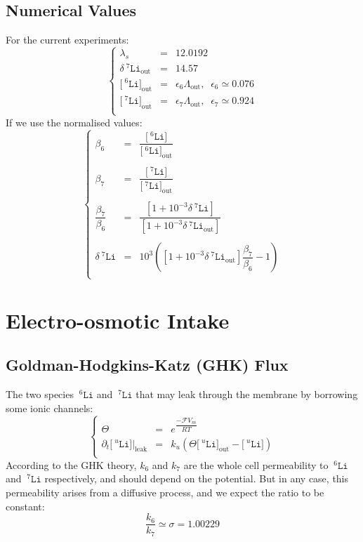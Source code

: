 \documentclass[aps,onecolumn,11pt]{revtex4}
\newcommand{\mychem}[1]{\mathtt{#1}}
\newcommand{\myconc}[1]{\big[#1\big]}
\newcommand{\Faraday}{\mathcal{F}}
\newcommand{\spLi}[1]{{\!~^{#1}\mychem{Li}}}
\newcommand{\Li}[1]{\myconc{\spLi{#1}}}
\newcommand{\deltaLi}{\delta\!\!\spLi{7}}
\newcommand{\myleak}[1]{\left.{#1}\right\vert_{\mathrm{leak}}}
\newcommand{\myout}[1]{{#1}_{\mathrm{out}}}
\newcommand{\LiOut}[1]{\myout{\Li{#1}}}
\newcommand{\LiAll}{\Lambda}
\newcommand{\LiAllOut}{\myout{\LiAll}}
\newcommand{\deltaLiOut}{\myout{\deltaLi}}
\begin{document}
\subsection{Numerical Values}
For the current experiments:
\begin{equation}
\left\lbrace
\begin{array}{rcl}
	\lambda_s   & = & 12.0192\\
	\deltaLiOut & = & 14.57\\
	\LiOut{6}   & = & \epsilon_6 \LiAllOut, \;\;\epsilon_6\simeq 0.076\\
	\LiOut{7}   & = & \epsilon_7 \LiAllOut, \;\;\epsilon_7\simeq 0.924\\
\end{array}
\right. 
\end{equation}
If we use the normalised values:
\begin{equation}
\label{eq:beta}
\left\lbrace
\begin{array}{rcl}
	\beta_6 & = & \dfrac{\Li{6}}{\LiOut{6}}\\
	\\
	\beta_7 & = & \dfrac{\Li{7}}{\LiOut{7}}\\
	\\
	\dfrac{\beta_7}{\beta_6} & = & \dfrac{\left[1+10^{-3}\deltaLi\right]}{\left[1+10^{-3}\deltaLiOut\right]}\\
	\\
	\deltaLi & = & 10^3 \left( \left[1+10^{-3}\deltaLiOut\right]\dfrac{\beta_7}{\beta_6} -1 \right)\\
\end{array}
\right.
\end{equation}


\section{Electro-osmotic Intake}
\subsection{Goldman-Hodgkins-Katz (GHK) Flux}
The two species $\spLi{6}$ and $\spLi{7}$ that may leak through the membrane by borrowing some ionic channels:
\begin{equation}
\left\lbrace
\begin{array}{rcl}
	\Theta    & = & e^{\dfrac{-\Faraday V_m }{RT}} \\
	\partial_t \myleak{\Li{u}} & = & k_u \left( \Theta \LiOut{u} - \Li{u}\right)\\
\end{array}
\right.
\end{equation}
According to the GHK theory, $k_6$ and $k_7$ are the whole cell permeability to $\spLi{6}$ and $\spLi{7}$ respectively,
and should depend on the potential. But in any case, this permeability arises from a diffusive process, and we expect the ratio to be constant:
\begin{equation}
	\dfrac{k_6}{k_7} \simeq \sigma = 1.00229
\end{equation}
\end{document}
